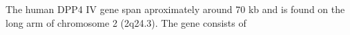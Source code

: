 The human DPP4 IV gene span aproximately around 70 kb and is found on the long arm of chromosome 2 (2q24.3). The gene consists of 